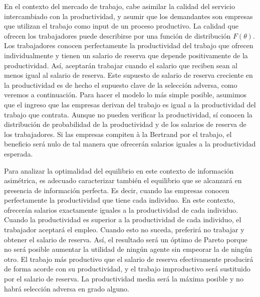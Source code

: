 \documentclass{nuevotema}
\begin{document}
En el contexto del mercado de trabajo, cabe asimilar la calidad del servicio intercambiado con la productividad, y asumir que los demandantes son empresas que utilizan el trabajo como input de un proceso productivo. La calidad que ofrecen los trabajadores puede describirse por una función de distribución $F(\theta)$. Los trabajadores conocen perfectamente la productividad del trabajo que ofrecen individualmente y tienen un salario de reserva que depende positivamente de la productividad. Así, aceptarán trabajar cuando el salario que reciben sean al menos igual al salario de reserva. Este supuesto de salario de reserva creciente en la productividad es de hecho el supuesto clave de la selección adversa, como veremos a continuación. Para hacer el modelo lo más simple posible, asumimos que el ingreso que las empresas derivan del trabajo es igual a la productividad del trabajo que contrata. Aunque no pueden verificar la productividad, sí conocen la distribución de probabilidad de la productividad y de los salarios de reserva de los trabajadores. Si las empresas compiten à la Bertrand por el trabajo, el beneficio será nulo de tal manera que ofrecerán salarios iguales a la productividad esperada. 

Para analizar la optimalidad del equilibrio en este contexto de información asimétrica, es adecuado caracterizar también el equilibrio que se alcanzará en presencia de información perfecta. Es decir, cuando las empresas conocen perfectamente la productividad que tiene cada individuo. En este contexto, ofrecerán salarios exactamente iguales a la productividad de cada individuo. Cuando la productividad es superior a la productividad de cada individuo, el trabajador aceptará el empleo. Cuando esto no suceda, preferirá no trabajar y obtener el salario de reserva. Así, el resultado será un óptimo de Pareto porque no será posible aumentar la utilidad de ningún agente sin empeorar la de ningún otro. El trabajo más productivo que el salario de reserva efectivamente producirá de forma acorde con su productividad, y el trabajo improductivo será sustituido por el salario de reserva. La productividad media será la máxima posible y no habrá selección adversa en grado alguno.
\end{document}

